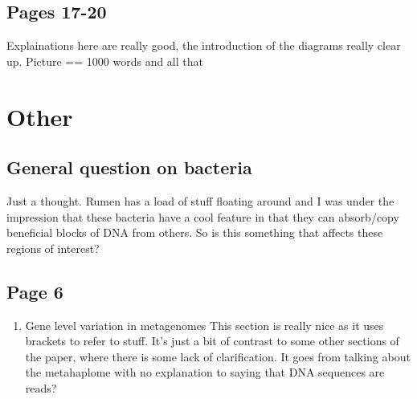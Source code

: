 \documentclass[11pt]{article}
\begin{document}
\subsection{Pages 17-20}
\label{sec-4-5}
Explainations here are really good, the introduction of the diagrams really clear up. Picture == 1000 words and all that 

\section{Other}
\label{sec-5}

\subsection{General question on bacteria}
\label{sec-5-1}
Just a thought. Rumen has a load of stuff floating around and I was under the impression that these bacteria have a cool feature in that they can 
absorb/copy beneficial blocks of DNA from others. So is this something that affects these regions of interest?  

\subsection{Page 6}
\label{sec-5-2}

\begin{enumerate}
\item Gene level variation in metagenomes
\label{sec-5-2-0-1}
This section is really nice as it uses brackets to refer to stuff. 
It's just a bit of contrast to some other sections of the paper, where there is some lack of clarification. 
It goes from talking about the metahaplome with no explanation to saying that DNA sequences are reads?
\end{enumerate}
\end{document}
